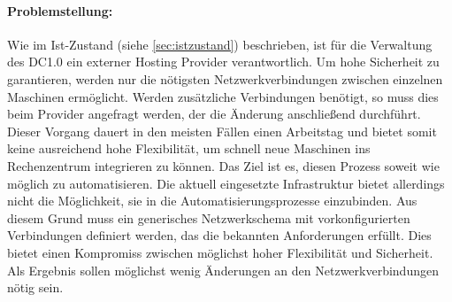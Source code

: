 \paragraph{Problemstellung:} Wie im Ist-Zustand (siehe \ref{sec:istzustand}) beschrieben, ist für die Verwaltung des DC1.0 ein externer Hosting Provider verantwortlich. Um hohe Sicherheit zu garantieren, werden nur die nötigsten Netzwerkverbindungen zwischen einzelnen Maschinen ermöglicht. Werden zusätzliche Verbindungen benötigt, so muss dies beim Provider angefragt werden, der die Änderung anschließend durchführt. Dieser Vorgang dauert in den meisten Fällen einen Arbeitstag und bietet somit keine ausreichend hohe Flexibilität, um schnell neue Maschinen ins Rechenzentrum integrieren zu können. Das Ziel ist es, diesen Prozess soweit wie möglich zu automatisieren. Die aktuell eingesetzte Infrastruktur bietet allerdings nicht die Möglichkeit, sie in die Automatisierungsprozesse einzubinden. Aus diesem Grund muss ein generisches Netzwerkschema mit vorkonfigurierten Verbindungen definiert werden, das die bekannten Anforderungen erfüllt. Dies bietet einen Kompromiss zwischen möglichst hoher Flexibilität und Sicherheit. Als Ergebnis sollen möglichst wenig Änderungen an den Netzwerkverbindungen nötig sein.

